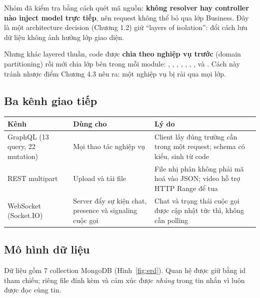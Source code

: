 \documentclass[11pt, a4paper]{article}
\begin{document}
Nhóm đã kiểm tra bằng cách quét mã nguồn: \textbf{không resolver hay controller nào inject model trực tiếp}, nên request không thể bỏ qua lớp Business. Đây là một architecture decision (Chương 1.2) giữ ``layers of isolation'': đổi cách lưu dữ liệu không ảnh hưởng lớp giao diện.

Nhưng khác layered thuần, code được \textbf{chia theo nghiệp vụ trước} (domain partitioning) rồi mới chia lớp bên trong mỗi module: , , , , , , ,  và . Cách này tránh nhược điểm Chương 4.3 nêu ra: một nghiệp vụ bị rải qua mọi lớp.

\subsection{Ba kênh giao tiếp}
\label{sec:channels}
\begin{table}[H]
  \centering
  \small
  \begin{tabularx}{\linewidth}{lYY}
    \toprule
    \textbf{Kênh} & \textbf{Dùng cho} & \textbf{Lý do} \\
    \midrule
    GraphQL  (13 query, 22 mutation) & Mọi thao tác nghiệp vụ & Client lấy đúng trường cần trong một request; schema có kiểu, sinh từ code \\
    REST multipart  & Upload và tải file & File nhị phân không phải mã hoá vào JSON; video hỗ trợ HTTP Range để tua \\
    WebSocket (Socket.IO) & Server đẩy sự kiện chat, presence và signaling cuộc gọi & Chat và trạng thái cuộc gọi được cập nhật tức thì, không cần polling \\
    \bottomrule
  \end{tabularx}
\end{table}

\subsection{Mô hình dữ liệu}
\label{sec:data}

Dữ liệu gồm 7 collection MongoDB (Hình~\ref{fig:erd}). Quan hệ được giữ bằng id tham chiếu; riêng file đính kèm và cảm xúc được \emph{nhúng} trong tin nhắn vì luôn được đọc cùng tin.
\end{document}
